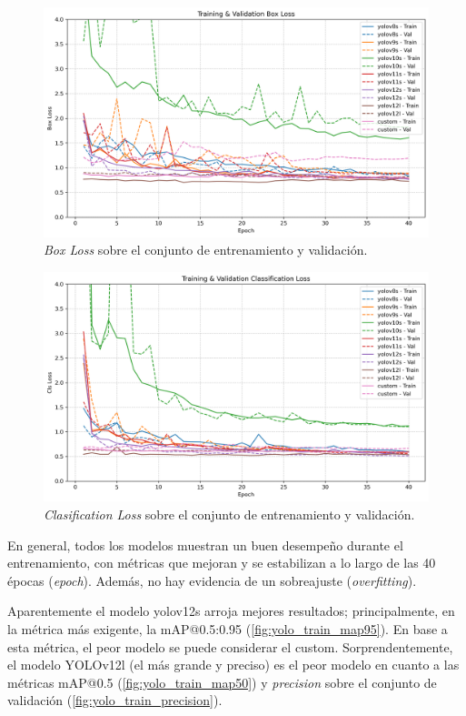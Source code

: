 \documentclass[12pt,a4paper,onecolumn,oneside]{report}
\begin{document}
\begin{figure}[H]
  \centering
  \includegraphics[width=1.0\textwidth]{figuras/yolo_plots/box_loss.png}
  \caption{\textit{Box Loss} sobre el conjunto de entrenamiento y validación.}
  \label{fig:yolo_train_box_loss}
\end{figure}

\begin{figure}[H]
  \centering
  \includegraphics[width=1.0\textwidth]{figuras/yolo_plots/cls_loss.png}
  \caption{\textit{Clasification Loss} sobre el conjunto de entrenamiento y validación.}
  \label{fig:yolo_train_cls_loss}
\end{figure}

En general, todos los modelos muestran un buen desempeño durante el entrenamiento, con métricas que mejoran y se estabilizan a lo largo de las 40 épocas (\textit{epoch}). Además, 
no hay evidencia de un sobreajuste (\textit{overfitting}).

Aparentemente el modelo yolov12s arroja mejores resultados; principalmente, en la métrica más exigente, la mAP@0.5:0.95 (\autoref{fig:yolo_train_map95}). En base a esta métrica, el peor modelo se puede considerar el custom.
Sorprendentemente, el modelo YOLOv12l (el más grande y preciso) es el peor modelo en cuanto a las métricas mAP@0.5 (\autoref{fig:yolo_train_map50}) y \textit{precision} sobre el conjunto de validación (\autoref{fig:yolo_train_precision}). 
\end{document}
